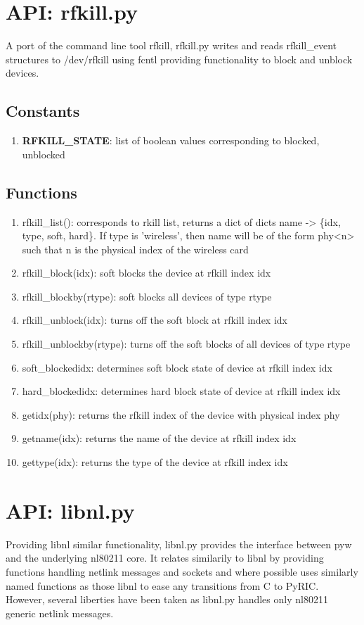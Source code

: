 \documentclass[11pt]{article}
\begin{document}
\begin{appendices}
\section{API: rfkill.py}\label{sec:rfkillapi}
A port of the command line tool rfkill, rfkill.py writes and reads rfkill\_event 
structures to /dev/rfkill using fcntl providing functionality to block and unblock 
devices. 

\subsection{Constants}
\begin{enumerate}
\item \textbf{RFKILL\_STATE}: list of boolean values corresponding to blocked, 
unblocked
\end{enumerate}

\subsection{Functions}
\begin{enumerate}
\item rfkill\_list(): corresponds to rkill list, returns a dict of dicts name -> 
\{idx, type, soft, hard\}. If type is 'wireless', then name will be of the form
phy<n> such that n is the physical index of the wireless card 
\item rfkill\_block(idx): soft blocks the device at rfkill index idx
\item rfkill\_blockby(rtype): soft blocks all devices of type rtype
\item rfkill\_unblock(idx): turns off the soft block at rfkill index idx
\item rfkill\_unblockby(rtype): turns off the soft blocks of all devices of type
rtype
\item soft\_blocked{idx}: determines soft block state of device at rfkill index idx
\item hard\_blocked{idx}: determines hard block state of device at rfkill index idx
\item getidx(phy): returns the rfkill index of the device with physical index phy
\item getname(idx): returns the name of the device at rfkill index idx
\item gettype(idx): returns the type of the device at rfkill index idx
\end{enumerate}

\section{API: libnl.py}\label{sec:libnlapi}
Providing libnl similar functionality, libnl.py provides the interface between
pyw and the underlying nl80211 core. It relates similarily to libnl by providing
functions handling netlink messages and sockets and where possible uses similarly
named functions as those libnl to ease any transitions from C to PyRIC. However,
several liberties have been taken as libnl.py handles only nl80211 generic netlink
messages.


\end{appendices}
\end{document}

